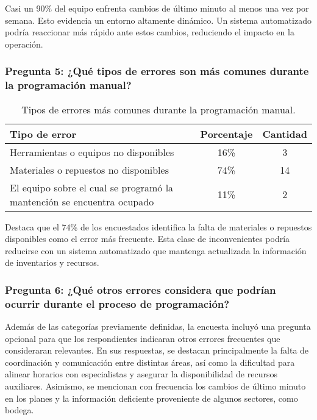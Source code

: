 \documentclass{article}
\begin{document}
Casi un 90\% del equipo enfrenta cambios de último minuto al menos una vez por semana. Esto evidencia un entorno altamente dinámico. Un sistema automatizado podría reaccionar más rápido ante estos cambios, reduciendo el impacto en la operación.



\subsubsection*{Pregunta 5: ¿Qué tipos de errores son más comunes durante la programación manual?}

\begin{table}[H]
    \centering
    \begin{tabular}{p{7cm}cc}
        \toprule
        \textbf{Tipo de error} & \textbf{Porcentaje} & \textbf{Cantidad} \\
        \midrule
        Herramientas o equipos no disponibles & 16\% & 3 \\
        Materiales o repuestos no disponibles & 74\% & 14 \\
        El equipo sobre el cual se programó la mantención se encuentra ocupado & 11\% & 2 \\
        \bottomrule
    \end{tabular}
    \caption{Tipos de errores más comunes durante la programación manual.}
    \label{tab:errores_comunes}
\end{table}

Destaca que el 74\% de los encuestados identifica la falta de materiales o repuestos disponibles como el error más frecuente. Esta clase de inconvenientes podría reducirse con un sistema automatizado que mantenga actualizada la información de inventarios y recursos.


\subsubsection*{Pregunta 6: ¿Qué otros errores considera que podrían ocurrir durante el proceso de programación?}

Además de las categorías previamente definidas, la encuesta incluyó una pregunta opcional para que los respondientes indicaran otros errores frecuentes que consideraran relevantes. En sus respuestas, se destacan principalmente la falta de coordinación y comunicación entre distintas áreas, así como la dificultad para alinear horarios con especialistas y asegurar la disponibilidad de recursos auxiliares. Asimismo, se mencionan con frecuencia los cambios de último minuto en los planes y la información deficiente proveniente de algunos sectores, como bodega.
\end{document}
